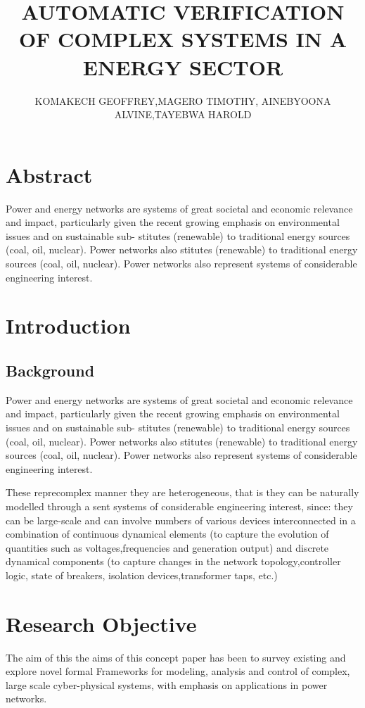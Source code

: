 \documentclass[11pt]{article}
\title{AUTOMATIC VERIFICATION OF COMPLEX SYSTEMS IN A ENERGY SECTOR}
\author{KOMAKECH GEOFFREY,MAGERO TIMOTHY, 	AINEBYOONA ALVINE,TAYEBWA HAROLD}
\begin{document}
\maketitle
\section{Abstract}
Power and energy networks are systems of great societal and economic relevance and impact, particularly given the recent growing emphasis on environmental issues and on sustainable sub- stitutes (renewable) to traditional energy sources (coal, oil, nuclear). Power networks also stitutes (renewable) to traditional energy sources (coal, oil, nuclear). Power networks also represent systems of considerable engineering interest. 
\section{Introduction}
\subsection{Background}
\cite{ru}

Power and energy networks are systems of great societal and economic relevance and impact, particularly given the recent growing emphasis on environmental issues and on sustainable sub- stitutes (renewable) to traditional energy sources (coal, oil, nuclear). Power networks also stitutes (renewable) to traditional energy sources (coal, oil, nuclear). Power networks also represent systems of considerable engineering interest.
\space
\newline

These reprecomplex manner they are heterogeneous, that is they can be naturally modelled through a sent systems of considerable engineering interest, since: they can be large-scale and can involve numbers of various devices interconnected in a combination of continuous dynamical elements (to capture the evolution of quantities such as voltages,frequencies and generation output) and discrete dynamical components (to capture changes in the network topology,controller logic, state of breakers, isolation devices,transformer taps, etc.)

\section{Research Objective}
The aim of this the aims of this concept paper has been to survey existing and explore novel formal Frameworks for modeling, analysis and control of complex, large scale cyber-physical systems, with emphasis on applications in power networks.
\end{document}
